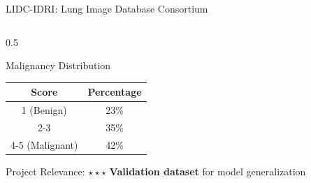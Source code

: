 \documentclass[aspectratio=169]{beamer}
\begin{document}
\begin{frame}{LIDC-IDRI: Lung Image Database Consortium}
\begin{columns}
\begin{column}{0.5\textwidth}
            \begin{block}{Malignancy Distribution}
                \begin{center}
                    \begin{tabular}{cc}
                        \toprule
                        \textbf{Score} & \textbf{Percentage} \\
                        \midrule
                        1 (Benign) & 23\% \\
                        2-3 & 35\% \\
                        4-5 (Malignant) & 42\% \\
                        \bottomrule
                    \end{tabular}
                \end{center}
            \end{block}
            
            \begin{alertblock}{Project Relevance: $\star\star\star$}
                \textbf{Validation dataset} for model generalization
            \end{alertblock}
        \end{column}
    \end{columns}
\end{frame}
\end{document}
